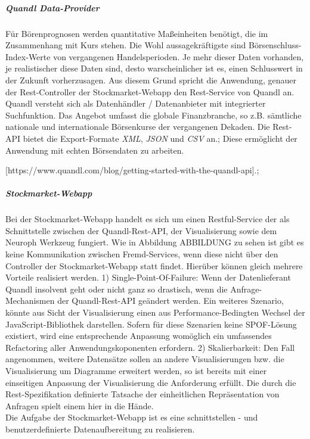 \subparagraph{Quandl Data-Provider}
Für Börenprognosen werden quantitative Maßeinheiten benötigt, die im Zusammenhang mit Kurs stehen. Die Wohl aussagekräftigste sind Börsenschluss-Index-Werte von vergangenen Handelsperioden. Je mehr dieser Daten vorhanden, je realistischer diese Daten sind, desto warscheinlicher ist es, einen Schlusswert in der Zukunft vorherzusagen. 
Aus diesem Grund spricht die Anwendung, genauer der Rest-Controller der Stockmarket-Webapp den Rest-Service von Quandl an.  
Quandl versteht sich als Datenhändler / Datenanbieter mit integrierter Suchfunktion. Das Angebot umfasst die globale Finanzbranche, so z.B. sämtliche nationale und internationale Börsenkurse der vergangenen Dekaden. 
Die Rest-API bietet die Export-Formate \emph{XML}, \emph{JSON} und \emph{CSV} an.\linebreak; 
Diese ermöglicht der Anwendung mit echten Börsendaten zu arbeiten. 

[https://www.quandl.com/blog/getting-started-with-the-quandl-api].\linebreak;

\subparagraph{Stockmarket-Webapp}
Bei der Stockmarket-Webapp handelt es sich um einen Restful-Service der als Schnittstelle zwischen der Quandl-Rest-API, der Visualisierung sowie dem Neuroph Werkzeug fungiert. Wie in Abbildung ABBILDUNG zu sehen ist gibt es keine Kommunikation zwischen Fremd-Services, wenn diese nicht über den Controller der Stockmarket-Webapp statt findet. Hierüber können gleich mehrere Vorteile realisiert werden. 
1) Single-Point-Of-Failure: Wenn der Datenlieferant Quandl insolvent geht oder nicht ganz so drastisch, wenn die Anfrage-Mechanismen der Quandl-Rest-API geändert werden. Ein weiteres Szenario, könnte aus Sicht der Visualisierung einen aus Performance-Bedingten Wechsel der JavaScript-Bibliothek darstellen. Sofern für diese Szenarien keine SPOF-Lösung existiert, wird eine entsprechende Anpassung womöglich ein umfassendes Refactoring aller Anwendungskoponenten erfordern. 
2) Skalierbarkeit: Den Fall angenommen, weitere Datensätze sollen an andere Visualisierungen bzw. die Visualisierung um Diagramme erweitert werden, so ist bereits mit einer einseitigen Anpassung der Visualisierung die Anforderung erfüllt. Die durch die Rest-Spezifikation definierte Tatsache der einheitlichen Repräsentation von Anfragen spielt einem hier in die Hände. \\
Die Aufgabe der Stockmarket-Webapp ist es eine schnittstellen - und benutzerdefinierte Datenaufbereitung zu realisieren. 

